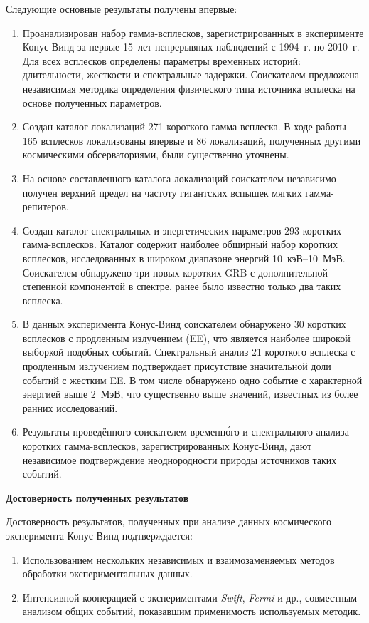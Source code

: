 Следующие основные результаты получены впервые:
\begin{enumerate}
\item Проанализирован набор гамма-всплесков, зарегистрированных в эксперименте 
 Конус-Винд за первые 15~лет непрерывных наблюдений с 1994~г. по 2010~г. Для всех 
 всплесков определены параметры временных историй: длительности, жесткости и спектральные задержки.
 Соискателем предложена независимая методика определения физического типа источника всплеска на основе 
 полученных параметров.
\item Создан каталог локализаций 271 короткого гамма-всплеска. 
 В ходе работы 165 всплесков локализованы впервые и 86 локализаций, 
 полученных другими космическими обсерваториями, были существенно уточнены. 
\item На основе составленного каталога локализаций соискателем независимо
 получен верхний предел на частоту гигантских вспышек мягких гамма-репитеров.
\item Создан каталог спектральных и энергетических параметров 293 коротких гамма-всплесков. 
 Каталог содержит наиболее обширный набор коротких всплесков, исследованных 
 в широком диапазоне энергий 10~кэВ--10~МэВ. 
 Соискателем обнаружено три новых коротких GRB с дополнительной  
 степенной компонентой в спектре, ранее было известно только два таких всплеска. 
\item В данных эксперимента Конус-Винд соискателем обнаружено 30 коротких всплесков 
 с продленным излучением (EE), что является наиболее широкой выборкой подобных событий. 
 Спектральный анализ 21 короткого всплеска с продленным излучением подтверждает 
 присутствие значительной доли событий с жестким EE. В том числе обнаружено одно 
 событие с характерной энергией  выше 2~МэВ, что существенно выше значений, 
 известных из более ранних исследований. 
\item Результаты проведённого соискателем временн\'{о}го и спектрального анализа коротких гамма-всплесков, 
 зарегистрированных Конус-Винд, дают независимое подтверждение неоднородности природы источников таких событий.
\end{enumerate}

\underline{\textbf{Достоверность полученных результатов}}

Достоверность результатов, полученных при анализе данных космического
эксперимента Конус-Винд подтверждается:
\begin{enumerate}
\item Использованием нескольких независимых и взаимозаменяемых методов обработки экспериментальных данных.
\item Интенсивной кооперацией с экспериментами \textit{Swift}, \textit{Fermi} и др.,
 совместным анализом общих событий, показавшим применимость используемых методик.
\end{enumerate}

